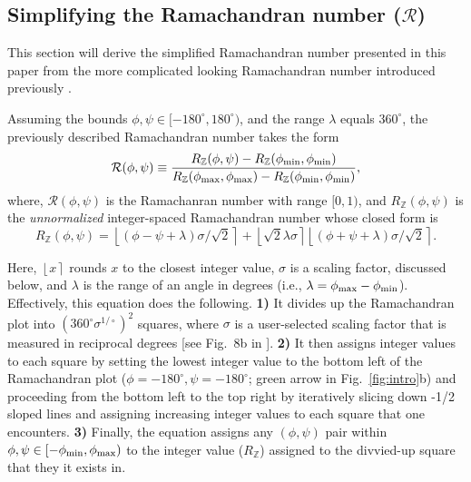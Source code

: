 \documentclass[fleqn,10pt,lineno]{wlpeerj} %
\newcommand{\round}[1]{\left \lfloor #1 \right \rceil }
\newcommand{\Fig}[1]{Fig.~\ref{#1}}
\begin{document}
\subsection{Simplifying the Ramachandran number ($\mathcal{R}$)\label{sec:simplifyR}}

This section will derive the simplified Ramachandran number presented in this paper from the more complicated looking Ramachandran number introduced previously \cite{Mannige2016}. 

Assuming the bounds $\phi,\psi \in [-180^\circ,180^\circ)$, and the range $\lambda$ equals $360^\circ$, the previously described Ramachandran number takes the form 
\begin{equation}
{\mathcal{R}}(\phi,\psi) \equiv  \frac{R_\mathbb{Z}(\phi,\psi)-R_{\mathbb{Z}}(\phi_{\rm{min}},\phi_{\rm{min}})}
{R_{\mathbb{Z}}(\phi_{\rm{max}},\phi_{\rm{max}})-R_{\mathbb{Z}}(\phi_{\rm{min}},\phi_{\rm{min}})},\label{rama}
\end{equation}
where, $\mathcal{R}(\phi,\psi)$ is the Ramachanran number with range $[0,1)$, and $R_\mathbb{Z}(\phi,\psi)$ is the {\it unnormalized} integer-spaced Ramachandran number whose closed form is
\begin{equation}
R_\mathbb{Z}(\phi,\psi)  = \round{(\phi - \psi + \lambda)\sigma/\sqrt{2}}  + \round{\sqrt{2} \lambda\sigma} \round{(\phi+\psi + \lambda)\sigma/\sqrt{2}}.\label{ramachandran_raw}
\end{equation}

Here, $\round{x}$ rounds $x$ to the closest integer value, $\sigma$ is a scaling factor, discussed below, and $\lambda$ is the range of an angle in degrees (i.e., $\lambda=\phi_{\rm max}-\phi_{\rm min}$). Effectively, this equation does the following. \textbf{1)} It divides up the Ramachandran plot into $(360^\circ \sigma^{1/\circ})^2$  squares, where $\sigma$ is a user-selected scaling factor that is measured in reciprocal degrees [see Fig.~8b in \cite{Mannige2016}]. \textbf{2)} It then assigns integer values to each square by setting the lowest integer value to the bottom left of the Ramachandran plot ($\phi=-180^\circ,\psi=-180^\circ$; green arrow in \Fig{fig:intro}b) and proceeding from the bottom left to the top right by iteratively slicing down -1/2 sloped lines and assigning increasing integer values to each square that one encounters. \textbf{3)} Finally, the equation assigns any $(\phi,\psi)$ pair within $\phi,\psi \in [-\phi_{\rm min},\phi_{\rm max})$ to the integer value ($R_\mathbb{Z}$) assigned to the divvied-up square that they it exists in. 
\end{document}
